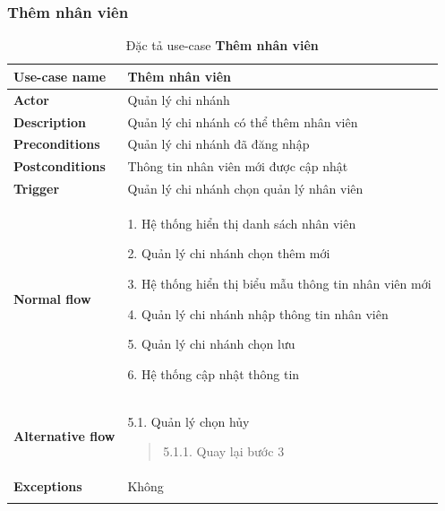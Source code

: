 \subsubsection{Thêm nhân viên}
{
    \setlength\extrarowheight{6pt}
    \begin{longtable}{| p{} | p{} |}
        \hline
        \textbf{Use-case name}
         &
        Thêm nhân viên
        \\
        \hline
        \textbf{Actor}
         &
        Quản lý chi nhánh
        \\
        \hline
        \textbf{Description}
         &
        Quản lý chi nhánh có thể thêm nhân viên
        \\
        \hline
        \textbf{Preconditions}
         &
        Quản lý chi nhánh đã đăng nhập
        \\
        \hline
        \textbf{Postconditions}
         &
        Thông tin nhân viên mới được cập nhật
        \\
        \hline
        \textbf{Trigger}
         &
        Quản lý chi nhánh chọn quản lý nhân viên
        \\
        \hline
        \begin{flushleft}
            \textbf{Normal flow}
        \end{flushleft}
         &
        1. Hệ thống hiển thị danh sách nhân viên

        2. Quản lý chi nhánh chọn thêm mới

        3. Hệ thống hiển thị biểu mẫu thông tin  nhân viên mới

        4. Quản lý chi nhánh nhập thông tin nhân viên

        5. Quản lý chi nhánh chọn lưu

        6. Hệ thống cập nhật thông tin
        \\
        \hline
        \begin{flushleft}
            \textbf{Alternative flow}
        \end{flushleft}
         &
        5.1. Quản lý chọn hủy
        \begin{quote}
            5.1.1. Quay lại bước 3
        \end{quote}
        \\
        \hline
        \textbf{Exceptions}
         &
        Không
        \\
        \hline
        \caption{Đặc tả use-case \textbf{Thêm nhân viên}}
    \end{longtable}
}

